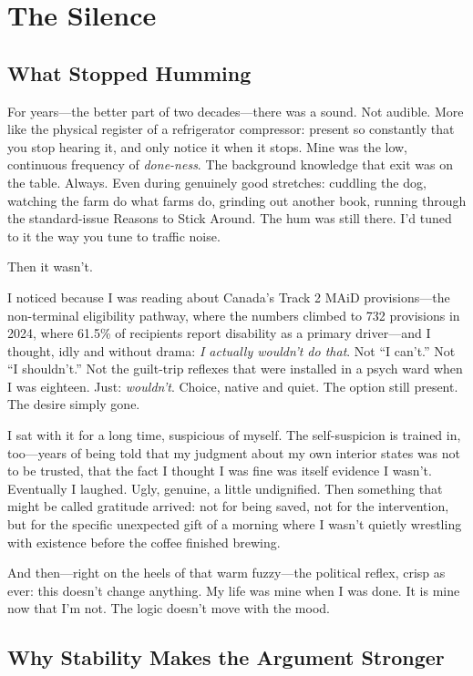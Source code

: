 \documentclass[10pt, letterpaper, twocolumn]{article}
\begin{document}
\section{The Silence}

\subsection{What Stopped Humming}

For years---the better part of two decades---there was a sound. Not audible. More like the physical register of a refrigerator compressor: present so constantly that you stop hearing it, and only notice it when it stops. Mine was the low, continuous frequency of \textit{done-ness}. The background knowledge that exit was on the table. Always. Even during genuinely good stretches: cuddling the dog, watching the farm do what farms do, grinding out another book, running through the standard-issue Reasons to Stick Around. The hum was still there. I'd tuned to it the way you tune to traffic noise.

Then it wasn't.

I noticed because I was reading about Canada's Track 2 MAiD provisions---the non-terminal eligibility pathway, where the numbers climbed to 732 provisions in 2024, where 61.5\% of recipients report disability as a primary driver---and I thought, idly and without drama: \textit{I actually wouldn't do that}. Not ``I can't.'' Not ``I shouldn't.'' Not the guilt-trip reflexes that were installed in a psych ward when I was eighteen. Just: \textit{wouldn't}. Choice, native and quiet. The option still present. The desire simply gone.

I sat with it for a long time, suspicious of myself. The self-suspicion is trained in, too---years of being told that my judgment about my own interior states was not to be trusted, that the fact I thought I was fine was itself evidence I wasn't. Eventually I laughed. Ugly, genuine, a little undignified. Then something that might be called gratitude arrived: not for being saved, not for the intervention, but for the specific unexpected gift of a morning where I wasn't quietly wrestling with existence before the coffee finished brewing.

And then---right on the heels of that warm fuzzy---the political reflex, crisp as ever: this doesn't change anything. My life was mine when I was done. It is mine now that I'm not. The logic doesn't move with the mood.

\subsection{Why Stability Makes the Argument Stronger}
\end{document}
